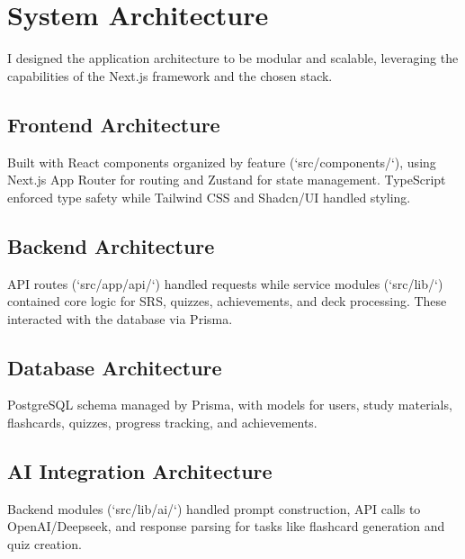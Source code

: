 \documentclass[
	letterpaper,
	11pt
]{jdf}
\begin{document}
\section{System Architecture}

I designed the application architecture to be modular and scalable, leveraging the capabilities of the Next.js framework and the chosen stack.

\subsection{Frontend Architecture}
Built with React components organized by feature (`src/components/`), using Next.js App Router for routing and Zustand for state management. TypeScript enforced type safety while Tailwind CSS and Shadcn/UI handled styling.

\subsection{Backend Architecture}
API routes (`src/app/api/`) handled requests while service modules (`src/lib/`) contained core logic for SRS, quizzes, achievements, and deck processing. These interacted with the database via Prisma.

\subsection{Database Architecture}
PostgreSQL schema managed by Prisma, with models for users, study materials, flashcards, quizzes, progress tracking, and achievements.

\subsection{AI Integration Architecture}
Backend modules (`src/lib/ai/`) handled prompt construction, API calls to OpenAI/Deepseek, and response parsing for tasks like flashcard generation and quiz creation.
\end{document}
